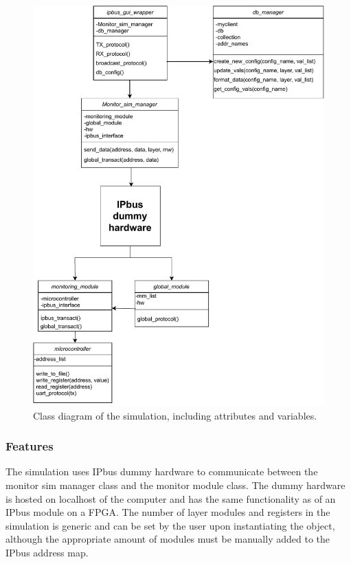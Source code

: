 \documentclass[main.tex]{subfiles}
\begin{document}
\begin{figure}[!ht]
    \centering
    \includegraphics[width=14cm]{images/class chart.pdf}
    \caption{Class diagram of the simulation, including attributes and variables.}
    \label{fig: class_diagram}
\end{figure}
\FloatBarrier


\subsubsection{Features}

The simulation uses IPbus dummy hardware to communicate between the monitor sim manager class and the monitor module class. The dummy hardware is hosted on localhost of the computer and has the same functionality as of an IPbus module on a FPGA.  The number of layer modules and registers in the simulation is generic and can be set by the user upon instantiating the object, although the appropriate amount of modules must be manually added to the IPbus address map.
\end{document}
